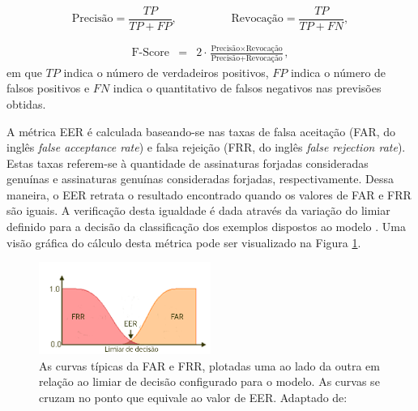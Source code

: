 \begin{equation*}
\textrm{Precisão} = \frac{TP}{TP + FP}, \hspace{2cm} \textrm{Revocação} = \frac{TP}{TP + FN},
\end{equation*}


\begin{eqnarray*}
\textrm{F-Score} &=&  2\cdot \frac{\textrm{Precisão} \times \textrm{Revocação}}{\textrm{Precisão} + \textrm{Revocação}},
\end{eqnarray*} em que $TP$ indica o número de verdadeiros positivos, $FP$ indica o número de falsos positivos e $FN$ indica o quantitativo de falsos negativos nas previsões obtidas.

A métrica EER é calculada baseando-se nas taxas de falsa aceitação (FAR, do inglês \emph{false acceptance rate}) e falsa rejeição (FRR, do inglês \emph{false rejection rate}). Estas taxas referem-se à quantidade de assinaturas forjadas consideradas genuínas e assinaturas genuínas consideradas forjadas, respectivamente. Dessa maneira, o EER retrata o resultado encontrado quando os valores de FAR e FRR são iguais. A verificação desta igualdade é dada através da variação do limiar definido para a decisão da classificação dos exemplos dispostos ao modelo \cite{Wirtz}. Uma visão gráfica do cálculo desta métrica pode ser visualizado na Figura \ref{fig:eer}.

\begin{figure}[h!]
  \centering
  \caption{As curvas típicas da FAR e FRR, plotadas uma ao lado da outra em relação ao limiar de decisão configurado para o modelo. As curvas se cruzam no ponto que equivale ao valor de EER. Adaptado de: \cite{Simao}}
  \label{fig:eer}
  \includegraphics[width=0.5\textwidth]{imgs/eer}
\end{figure}